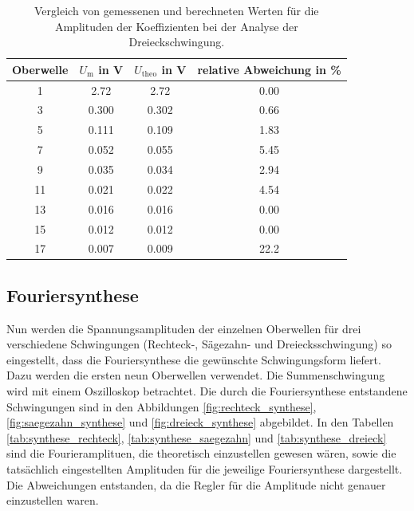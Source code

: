 \begin{table}
  \centering
  \begin{tabular}{c c c c}
    \toprule
    Oberwelle & $U_\text{m}$ in \si{\volt} & $U_\text{theo}$ in \si{\volt} &
    relative Abweichung in \% \\
    \midrule
    1  & 2.72  & 2.72  & 0.00 \\
    3  & 0.300 & 0.302 & 0.66 \\
    5  & 0.111 & 0.109 & 1.83 \\
    7  & 0.052 & 0.055 & 5.45 \\
    9  & 0.035 & 0.034 & 2.94 \\
    11 & 0.021 & 0.022 & 4.54 \\
    13 & 0.016 & 0.016 & 0.00 \\
    15 & 0.012 & 0.012 & 0.00 \\
    17 & 0.007 & 0.009 & 22.2 \\
    \bottomrule
  \end{tabular}
  \caption{Vergleich von gemessenen und berechneten Werten für die Amplituden
    der Koeffizienten bei der Analyse der Dreieckschwingung.}
  \label{tab:analyse_dreieck}
\end{table}


\subsection{Fouriersynthese}
Nun werden die Spannungsamplituden der einzelnen Oberwellen für drei verschiedene
Schwingungen (Rechteck-, Sägezahn- und Dreiecksschwingung) so eingestellt, dass
die Fouriersynthese die gewünschte Schwingungsform liefert. Dazu werden die ersten
neun Oberwellen verwendet.
Die Summenschwingung wird mit einem Oszilloskop betrachtet. Die durch die
Fouriersynthese entstandene Schwingungen sind in den Abbildungen
\ref{fig:rechteck_synthese}, \ref{fig:saegezahn_synthese} und \ref{fig:dreieck_synthese}
abgebildet. In den Tabellen \ref{tab:synthese_rechteck}, \ref{tab:synthese_saegezahn}
und \ref{tab:synthese_dreieck} sind die Fourieramplituen, die theoretisch
einzustellen gewesen wären, sowie die tatsächlich eingestellten Amplituden für die
jeweilige Fouriersynthese dargestellt. Die Abweichungen entstanden, da die Regler
für die Amplitude nicht genauer einzustellen waren.


